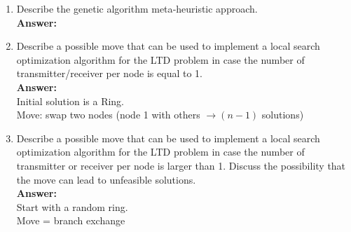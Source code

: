 \documentclass[a4paper]{article}
\begin{document}
\begin{enumerate}
\item Describe  the  genetic  algorithm  meta‐heuristic  approach.\\
\textbf{Answer:}

\item Describe a possible move that can be used to implement a local search optimization algorithm for the LTD problem in case the number of transmitter/receiver per node is equal to 1.\\
\textbf{Answer:}\\
Initial solution is a Ring.\\
Move: swap two nodes (node 1 with others $\rightarrow (n-1)$ solutions)
\item Describe a possible move that can be used to implement a local search optimization algorithm for the LTD problem in case the number of transmitter or receiver per node is larger than 1. Discuss the possibility that the move can lead to unfeasible solutions.\\
\textbf{Answer:}\\
Start with a random ring.\\
Move = branch exchange

\end{enumerate}
\end{document}
